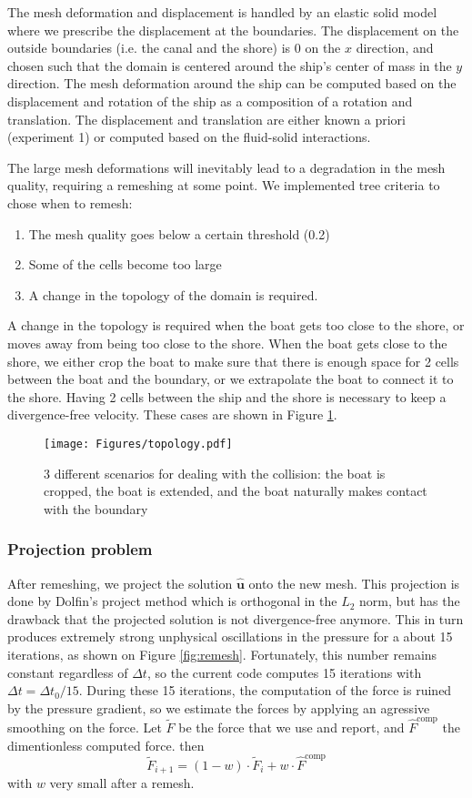 \documentclass[a4paper]{article}
\newcommand{\bhu}{{\bm{\hat{u}}}}
\begin{document}
The mesh deformation and displacement is handled by an elastic solid model where we prescribe the displacement at the boundaries. The displacement on the outside boundaries (i.e. the canal and the shore) is 0 on  the $x$ direction, and chosen such that the domain is centered around the ship's center of mass in the $y$ direction. The mesh deformation around the ship can be computed based on the displacement and rotation of the ship as a composition of a rotation and translation. The displacement and translation are either known a priori (experiment 1) or computed based on the fluid-solid interactions.


The large mesh deformations will inevitably lead to a degradation in the mesh quality, requiring a remeshing at some point. We implemented tree criteria to chose when to remesh:
\begin{enumerate}
    \item The mesh quality goes below a certain threshold (0.2)
    \item Some of the cells become too large 
    \item A change in the topology of the domain is required.
\end{enumerate}
A change in the topology is required when the boat gets too close to the shore, or moves away from being too close to the shore. When the boat gets close to the shore, we either crop the boat to make sure that there is enough space for 2 cells between the boat and the boundary, or we extrapolate the boat to connect it to the shore. Having 2 cells between the ship and the shore is necessary to keep a divergence-free velocity. These cases are shown in Figure \ref{fig:topology}.

\begin{figure}[hbtb]
    \centering
	\texttt{[image: Figures/topology.pdf]}
	\caption{3 different scenarios for dealing with the collision: the boat is cropped, the boat is extended, and the boat naturally makes contact with the boundary}
	\label{fig:topology}
\end{figure}

\subsubsection{Projection problem}
After remeshing, we project the solution $\bhu$ onto the new mesh. This projection is done by Dolfin's project method which is orthogonal in the $L_2$ norm, but has the drawback that the projected solution is not divergence-free anymore. This in turn produces extremely strong unphysical oscillations in the pressure for a about 15 iterations, as shown on Figure \ref{fig:remesh}. Fortunately, this number remains constant regardless of $\Delta t$, so the current code computes 15 iterations with $\Delta t = \Delta t_0/15$. During these 15 iterations, the computation of the force is ruined by the pressure gradient, so we estimate the forces by applying an agressive smoothing on the force. Let $\tilde{F}$ be the force that we use and report, and $\hat{F}^\text{comp}$ the dimentionless computed force. then 
\[
    \tilde{F}_{i+1} = (1-w) \cdot \tilde{F}_{i} + w \cdot \hat{F}^\text{comp}
\]
with $w$ very small after a remesh.
\end{document}
